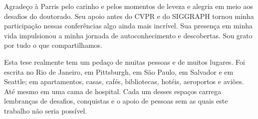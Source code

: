 Agradeço à Parris pelo carinho e pelos momentos de leveza e alegria em meio aos desafios do doutorado. Seu apoio antes do CVPR e do SIGGRAPH tornou minha participação nessas conferências algo ainda mais incrível. Sua presença em minha vida impulsionou a minha jornada de autoconhecimento e descobertas. Sou grato por tudo o que compartilhamos.

Esta tese realmente tem um pedaço de muitas pessoas e de muitos lugares. Foi escrita no Rio de Janeiro, em Pittsburgh, em São Paulo, em Salvador e em Seattle; em apartamentos, casas, cafés, bibliotecas, hotéis, aeroportos e aviões. Até mesmo em uma cama de hospital. Cada um desses espaços carrega lembranças de desafios, conquistas e o apoio de pessoas sem as quais este trabalho não seria possível.